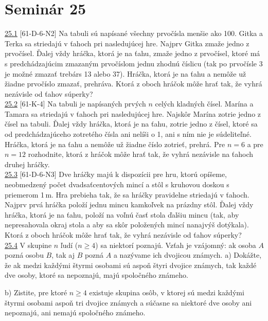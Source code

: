 \section*{Seminár 25}

\noindent \ul{25.1} [61-D-6-N2] Na tabuli sú napísané všechny prvočísla menšie ako 100. Gitka a Terka sa striedajú v ťahoch pri nasledujúcej hre. Najprv Gitka zmaže jedno z prvočísel. Ďalej vždy hráčka, ktorá je na ťahu, zmaže jedno z prvočísel, ktoré má s predchádzajúcim zmazaným prvočíslom jednu zhodnú číslicu (tak po prvočísle 3 je možné zmazať trebárs 13 alebo 37). Hráčka, ktorá je na ťahu a nemôže už žiadne prvočíslo zmazať, prehráva. Ktorá z oboch hráčok môže hrať tak, že vyhrá nezávisle od ťahov súperky?\\

\noindent \ul{25.2} [61-K-4] Na tabuli je napísaných prvých $n$ celých kladných čísel. Marína a Tamara sa striedajú v ťahoch pri nasledujúcej hre. Najskôr Marína zotrie jedno z čísel na tabuli. Ďalej vždy hráčka, ktorá je na ťahu, zotrie jedno z čísel, ktoré sa od predchádzajúceho zotretého čísla ani nelíši o 1, ani s ním nie je súdeliteľné. Hráčka, ktorá je na ťahu a nemôže už žiadne číslo zotrieť, prehrá. Pre $n = 6$ a pre $n = 12$ rozhodnite, ktorá z hráčok môže hrať tak, že vyhrá nezávisle na ťahoch druhej hráčky.\\

\noindent \ul{25.3} [61-D-6-N3] Dve hráčky majú k dispozícii pre hru, ktorú opíšeme, neobmedzený počet dvadsaťcentových mincí a stôl s kruhovou doskou s priemerom 1\,m. Hra prebieha tak, že sa hráčky pravidelne striedajú v ťahoch. Najprv prvá hráčka položí jednu mincu kamkoľvek na prázdny stôl. Ďalej vždy hráčka, ktorá je na ťahu, položí na voľnú časť stola ďalšiu mincu (tak, aby nepresahovala okraj stola a aby sa skôr položených mincí nanajvýš dotýkala). Ktorá z oboch hráčok môže hrať tak, že vyhrá nezávisle od ťahov súperky?\\

\noindent \ul{25.4} V skupine $n$ ľudí ($n \geq 4$) sa niektorí poznajú. Vzťah  je vzájomný: ak osoba $A$ pozná osobu $B$, tak aj $B$ pozná $A$ a nazývame ich dvojicou známych.
a) Dokážte, že ak medzi každými štyrmi osobami sú aspoň štyri dvojice známych, tak každé dve osoby, ktoré sa nepoznajú, majú spoločného známeho.

b) Zistite, pre ktoré $n \geq 4$ existuje skupina osôb, v ktorej sú medzi každými štyrmi osobami aspoň tri dvojice známych a súčasne sa niektoré dve osoby ani nepoznajú, ani nemajú spoločného známeho.

